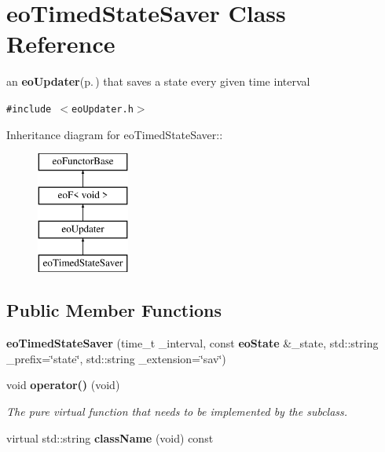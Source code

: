 \section{eo\-Timed\-State\-Saver Class Reference}
\label{classeo_timed_state_saver}
an {\bf eo\-Updater}{\rm (p.\,\pageref{classeo_updater})} that saves a state every given time interval  


{\tt \#include $<$eo\-Updater.h$>$}

Inheritance diagram for eo\-Timed\-State\-Saver::\begin{figure}[H]
\begin{center}
\leavevmode
\includegraphics[height=4cm]{classeo_timed_state_saver}
\end{center}
\end{figure}
\subsection*{Public Member Functions}
\begin{CompactItemize}
\item 
{\bf eo\-Timed\-State\-Saver} (time\_\-t \_\-interval, const {\bf eo\-State} \&\_\-state, std::string \_\-prefix=\char`\"{}state\char`\"{}, std::string \_\-extension=\char`\"{}sav\char`\"{})\label{classeo_timed_state_saver_a0}

\item 
void {\bf operator()} (void)\label{classeo_timed_state_saver_a1}

\begin{CompactList}\small\item\em The pure virtual function that needs to be implemented by the subclass. \item\end{CompactList}\item 
virtual std::string {\bf class\-Name} (void) const \label{classeo_timed_state_saver_a2}

\end{CompactItemize}
